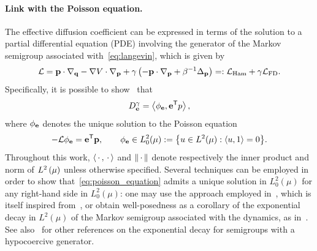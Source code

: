 \documentclass[11pt,a4paper]{article}
\begin{document}
\paragraph{Link with the Poisson equation.}
The effective diffusion coefficient
can be expressed in terms of the solution to a partial differential equation (PDE) involving the generator of the Markov semigroup associated with~\eqref{eq:langevin},
which is given by
\begin{equation}
    \label{eq:decomposition_generator}
    \mathcal L
    = \boldsymbol{\mathbf p} \cdot \nabla_{\boldsymbol{\mathbf q}} - \nabla V \cdot \nabla_{\boldsymbol{\mathbf p}} + \gamma \left( - \boldsymbol{\mathbf p} \cdot \nabla_{\boldsymbol{\mathbf p}} + \beta^{-1} \Delta_{\boldsymbol{\mathbf p}} \right)
    =: \mathcal L_{\rm Ham} + \gamma \mathcal L_{\rm FD}.
\end{equation}
Specifically, it is possible to show~\cite{MR663900} that
\begin{equation}
    \label{eq:effective_diffusion_poisson}
    D^{\gamma}_{\vect e} = \ip{\phi_{\vect e}}{\vect e^\t p},
\end{equation}
where $\phi_{\boldsymbol{\mathbf e}}$ denotes the unique solution to the Poisson equation
\begin{equation}
    \label{eq:poisson_equation}
    - \mathcal L \phi_{\vect e} = \vect e^\t \vect p,
    \qquad \phi_{\vect e} \in L^2_0(\mu) := \bigl\{ u \in L^2(\mu): \ip{u}{1} = 0 \bigr\}.
\end{equation}
Throughout this work,
$\ip{\dummy}{\dummy}$ and $\norm{\dummy}$ denote respectively the inner product and norm of $\lp{2}{\mu}$
unless otherwise specified.
Several techniques can be employed in order to show that~\eqref{eq:poisson_equation} admits a unique solution in $L^2_0(\mu)$
for any right-hand side in $L^2_0(\mu)$:
one may use the approach employed in~\cite[Proposition 5.1]{MR2793823},
which is itself inspired from~\cite[Lemma 2.1]{MR812349},
or obtain well-posedness as a corollary of the exponential decay in $L^2(\mu)$ of the Markov semigroup associated with the dynamics,
as in~\cite[Corollary 1]{roussel2018spectral}.
See also~\cite{Herau06,MR3106879,MR3522857,BFLS20} for other references on the exponential decay for semigroups with a hypocoercive generator.
\end{document}
